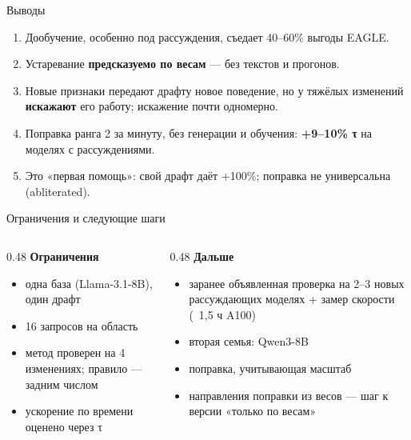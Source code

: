 \documentclass[aspectratio=169,11pt]{beamer}
\newcommand{\pos}[1]{\textcolor{good}{#1}}
\begin{document}
\begin{frame}{Выводы}
\begin{enumerate}
\item Дообучение, особенно под рассуждения, \alert{съедает 40--60\%} выгоды EAGLE.
\item Устаревание \textbf{предсказуемо по весам} --- без текстов и прогонов.
\item Новые признаки передают драфту новое поведение, но у тяжёлых изменений \textbf{искажают} его работу; искажение
почти одномерно.
\item Поправка ранга 2 за минуту, без генерации и обучения: \pos{\textbf{+9--10\% τ}} на моделях с рассуждениями.
\item Это «первая помощь»: свой драфт даёт +100\%; поправка не универсальна (abliterated).
\end{enumerate}
\end{frame}

\begin{frame}{Ограничения и следующие шаги}
\begin{columns}[T]
\begin{column}{0.48\textwidth}
\textbf{Ограничения}
\small
\begin{itemize}
\item одна база (Llama-3.1-8B), один драфт
\item 16 запросов на область
\item метод проверен на 4 изменениях; правило --- задним числом
\item ускорение по времени оценено через τ
\end{itemize}
\end{column}
\begin{column}{0.48\textwidth}
\textbf{Дальше}
\small
\begin{itemize}
\item заранее объявленная проверка на 2--3 новых рассуждающих моделях + замер скорости (~1,5 ч A100)
\item вторая семья: Qwen3-8B
\item поправка, учитывающая масштаб
\item направления поправки из весов --- шаг к версии «только по весам»
\end{itemize}
\end{column}
\end{columns}
\end{frame}
\end{document}
